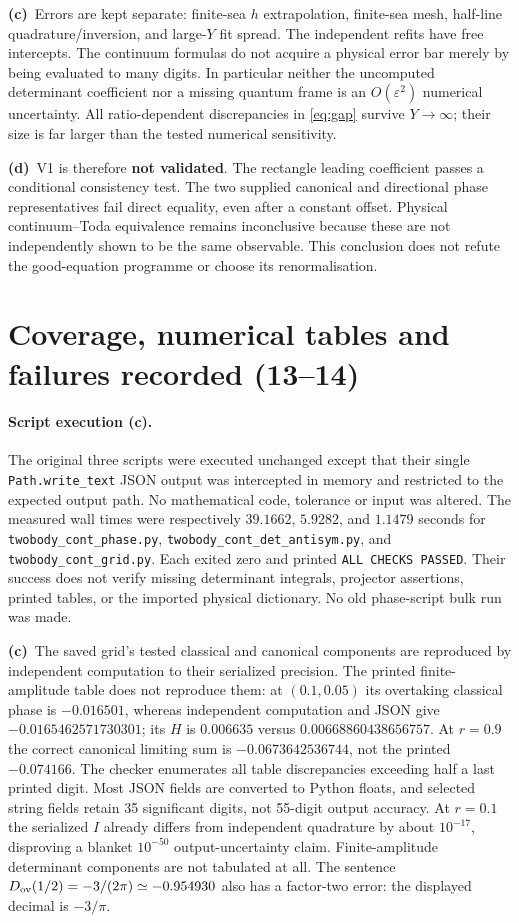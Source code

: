 \documentclass[11pt,a4paper]{article}
\newcommand{\Lc}{\textbf{(c)}\ }
\newcommand{\Ld}{\textbf{(d)}\ }
\newcommand{\file}[1]{\nolinkurl{#1}}
\begin{document}
\Lc Errors are kept separate: finite-sea $h$ extrapolation, finite-sea mesh,
half-line quadrature/inversion, and large-$Y$ fit spread. The independent
refits have free intercepts. The continuum formulas do not acquire a physical
error bar merely by being evaluated to many digits. In particular neither
the uncomputed determinant coefficient nor a missing quantum frame is an
$O(\varepsilon^2)$ numerical uncertainty. All ratio-dependent discrepancies
in \eqref{eq:gap} survive $Y\to\infty$; their size is far larger than the
tested numerical sensitivity.

\Ld V1 is therefore \textbf{not validated}. The rectangle leading coefficient
passes a conditional consistency test. The two supplied canonical and
directional phase representatives fail direct equality, even after a constant
offset. Physical continuum--Toda equivalence remains inconclusive because
these are not independently shown to be the same observable. This conclusion
does not refute the good-equation programme or choose its renormalisation.

\section{Coverage, numerical tables and failures recorded (13--14)}
\paragraph{Script execution (c).}
The original three scripts were executed unchanged except that their single
\file{Path.write_text} JSON output was intercepted in memory and restricted to
the expected output path. No mathematical code, tolerance or input was altered.
The measured wall times were respectively $39.1662$, $5.9282$, and $1.1479$
seconds for \file{twobody_cont_phase.py},
\file{twobody_cont_det_antisym.py}, and \file{twobody_cont_grid.py}.
Each exited zero and printed \texttt{ALL CHECKS PASSED}. Their success does not
verify missing determinant integrals, projector assertions, printed tables,
or the imported physical dictionary. No old phase-script bulk run was made.

\Lc The saved grid's tested classical and canonical components are reproduced
by independent computation to their serialized precision. The printed
finite-amplitude table does not reproduce them: at $(0.1,0.05)$ its
overtaking classical phase is $-0.016501$, whereas independent computation
and JSON give $-0.0165462571730301$; its $H$ is $0.006635$ versus
$0.00668860438656757$. At $r=0.9$ the correct canonical limiting sum is
$-0.0673642536744$, not the printed $-0.074166$.
The checker enumerates all table discrepancies exceeding half a last printed
digit. Most JSON fields are converted to Python floats, and selected string
fields retain 35 significant digits, not 55-digit output accuracy.
At $r=0.1$ the serialized $I$ already differs from independent quadrature
by about $10^{-17}$, disproving a blanket $10^{-50}$ output-uncertainty claim.
Finite-amplitude determinant components are not tabulated at all.
The sentence $D_{\rm ov}(1/2)=-3/(2\pi)\simeq-0.954930$ also has a factor-two
error: the displayed decimal is $-3/\pi$.
\end{document}
